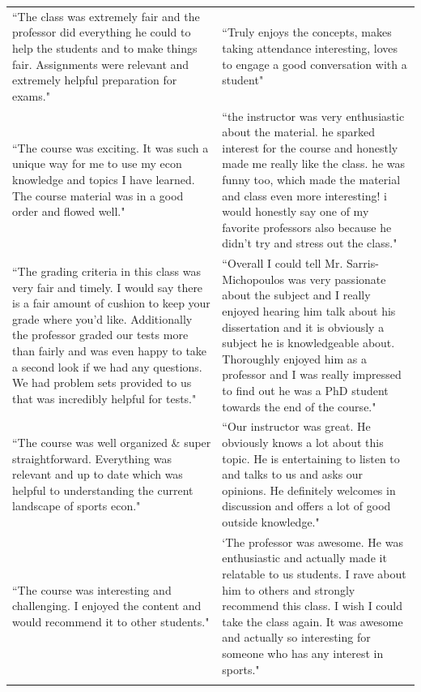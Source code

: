\documentclass[11pt]{article}
\begin{document}
\begin{longtable}{@{}p{}p{}@{}}
\addlinespace
\rowcolor{white} ``The class was extremely fair and the professor did
everything he could to help the students and to
make things fair. Assignments were relevant and
extremely helpful preparation for exams." & ``Truly enjoys the concepts, makes taking attendance
interesting, loves to engage a good conversation
with a student" \\
\addlinespace
\rowcolor{lightgray} ``The course was exciting. It was such a unique way
for me to use my econ knowledge and topics I have
learned. The course material was in a good order
and flowed well." & ``the instructor was very enthusiastic about the
material. he sparked interest for the course and
honestly made me really like the class. he was funny too, which made the material and class even
more interesting! i would honestly say one of my
favorite professors also because he didn't try and
stress out the class."  \\
\addlinespace
\rowcolor{white}  ``The grading criteria in this class was very fair and
timely. I would say there is a fair amount of cushion
to keep your grade where you'd like. Additionally
the professor graded our tests more than fairly and
was even happy to take a second look if we had any
questions. We had problem sets provided to us that
was incredibly helpful for tests." & ``Overall I could tell Mr. Sarris-Michopoulos was
very passionate about the subject and I really
enjoyed hearing him talk about his dissertation and
it is obviously a subject he is knowledgeable about.
Thoroughly enjoyed him as a professor and I was
really impressed to find out he was a PhD student
towards the end of the course." \\
\addlinespace
\rowcolor{lightgray}  ``The course was well organized \& super straightforward. Everything was relevant and up to date which was helpful to understanding the current landscape of sports econ." & ``Our instructor was great. He obviously knows a lot
about this topic. He is entertaining to listen to and talks
to us and asks our opinions. He definitely welcomes
in discussion and offers a lot of good outside
knowledge." \\
\addlinespace
\rowcolor{white} ``The course was interesting and challenging. I
enjoyed the content and would recommend it to
other students." & `The professor was awesome. He was enthusiastic
and actually made it relatable to us students. I rave
about him to others and strongly recommend this
class. I wish I could take the class again. It was
awesome and actually so interesting for someone
who has any interest in sports." \\
\addlinespace




\bottomrule
\bottomrule
\end{longtable}

\clearpage
\end{document}
